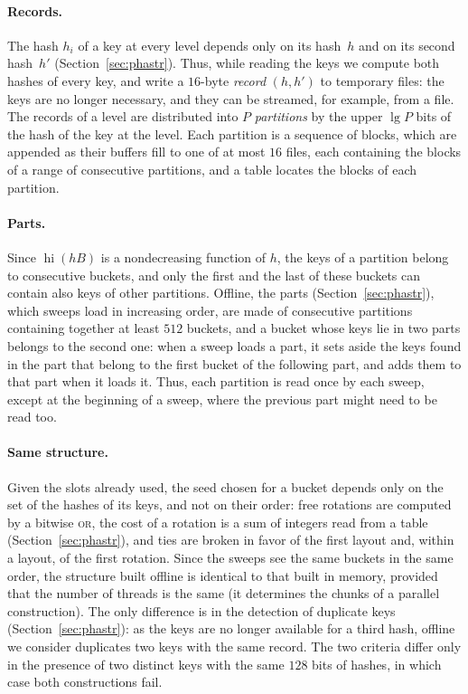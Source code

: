 \documentclass[11pt]{article}
\newcommand{\hi}{\operatorname{hi}}
\begin{document}
\paragraph{Records.}
The hash $h_i$ of a key at every level depends only on its hash~$h$ and on
its second hash~$h'$ (Section~\ref{sec:phastr}).
Thus, while reading the keys we compute both hashes of every key, and write a
$16$-byte \emph{record} $(h,h')$ to temporary files: the keys are no longer
necessary, and they can be streamed, for example, from a file. The records of
a level are distributed into $P$ \emph{partitions} by the upper $\lg P$ bits
of the hash of the key at the level. Each partition is a sequence of
blocks, which are appended as their buffers fill to one of at most $16$ files,
each containing the blocks of a range of consecutive partitions, and a table
locates the blocks of each partition.

\paragraph{Parts.}
Since $\hi(hB)$ is a nondecreasing function of $h$, the keys of a partition
belong to consecutive buckets, and only the first and the last of these
buckets can contain also keys of other partitions. Offline, the parts
(Section~\ref{sec:phastr}), which sweeps load in increasing order, are made
of consecutive partitions containing together at least $512$ buckets, and a
bucket whose keys lie in two parts belongs to the second one: when a sweep
loads a part, it sets aside the keys found in the part that belong to the
first bucket of the following part, and adds them to that part when it loads
it. Thus, each partition is read once by each sweep, except at the beginning
of a sweep, where the previous part might need to be read too.

\paragraph{Same structure.}
Given the slots already used, the seed chosen for a bucket depends only on
the set of the hashes of its keys, and not on their order: free rotations are
computed by a bitwise \textsc{or}, the cost of a rotation is a sum of
integers read from a table (Section~\ref{sec:phastr}), and ties are broken in
favor of the first layout and, within a layout, of the first rotation. Since the sweeps see the same
buckets in the same order, the structure built offline is identical to that
built in memory, provided that the number of threads is the same (it
determines the chunks of a parallel construction). The only difference is in
the detection of duplicate keys (Section~\ref{sec:phastr}): as the keys are no
longer available for a third hash, offline we consider duplicates two keys
with the same record. The two criteria differ only in the presence of two
distinct keys with the same $128$ bits of hashes, in which case both
constructions fail.
\end{document}
